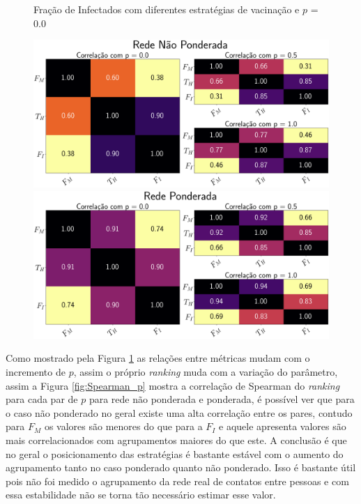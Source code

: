 \begin{figure}[H]
    \centering
    \captionsetup{font=normalsize,skip=0.8pt,singlelinecheck=on,labelsep=endash}
    \caption{Fração de Infectados com diferentes estratégias de vacinação e $p$ = 0.0}
    
    \includegraphics[scale= 0.4]{figuras/corr_p.png}
    \\
    \includegraphics[scale= 0.4]{figuras/corr_p_ponderado.png}
    \captionsetup{font=small,justification=justified}
    \caption*{}
    \label{fig:Spearman}
\end{figure}

Como mostrado pela Figura \ref{fig:Spearman} as relações entre métricas mudam com o incremento de $p$, assim o próprio \textit{ranking} muda com a variação do parâmetro, assim a Figura \ref{fig:Spearman_p} mostra a correlação de Spearman do \textit{ranking} para cada par de $p$ para rede não ponderada e ponderada, é possível ver que para o caso não ponderado no geral existe uma alta correlação entre os pares, contudo para $F_M$ os valores são menores do que para a $F_I$ e aquele apresenta valores são mais correlacionados com agrupamentos maiores do que este. A conclusão é que no geral o posicionamento das estratégias é bastante estável com o aumento do agrupamento tanto no caso ponderado quanto não ponderado. Isso é bastante útil pois não foi medido o agrupamento da rede real de contatos entre pessoas e com essa estabilidade não se torna tão necessário estimar esse valor.

